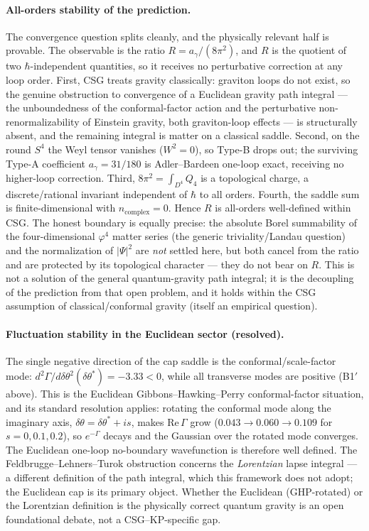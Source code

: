\documentclass[11pt,a4paper]{article}
\theoremstyle{plain}
\theoremstyle{definition}
\theoremstyle{remark}
\newcommand{\ag}{a_\gamma}
\newcommand{\dtheta}{\delta\theta}
\begin{document}
\paragraph{All-orders stability of the prediction.} The convergence question splits cleanly, and
the physically relevant half is provable. The observable is the ratio $R=\ag/(8\pi^2)$, and $R$
is the quotient of two $\hbar$-independent quantities, so it receives no perturbative correction
at any loop order. First, CSG treats gravity classically: graviton loops do not exist, so the
genuine obstruction to convergence of a Euclidean gravity path integral --- the unboundedness of
the conformal-factor action and the perturbative non-renormalizability of Einstein gravity, both
graviton-loop effects --- is structurally absent, and the remaining integral is matter on a
classical saddle. Second, on the round $S^4$ the Weyl tensor vanishes ($W^2=0$), so Type-B drops
out; the surviving Type-A coefficient $\ag=31/180$ is Adler--Bardeen one-loop exact, receiving no
higher-loop correction. Third, $8\pi^2=\int_{D^4}Q_4$ is a topological charge, a
discrete/rational invariant independent of $\hbar$ to all orders. Fourth, the saddle sum is
finite-dimensional with $n_{\mathrm{complex}}=0$. Hence $R$ is all-orders well-defined within CSG.
The honest boundary is equally precise: the absolute Borel summability of the four-dimensional
$\varphi^4$ matter series (the generic triviality/Landau question) and the normalization of
$|\Psi|^2$ are \emph{not} settled here, but both cancel from the ratio and are protected by its
topological character --- they do not bear on $R$. This is not a solution of the general
quantum-gravity path integral; it is the decoupling of the prediction from that open problem, and
it holds within the CSG assumption of classical/conformal gravity (itself an empirical question).

\paragraph{Fluctuation stability in the Euclidean sector (resolved).} The single negative
direction of the cap saddle is the conformal/scale-factor mode: $d^2\Gamma/d\dtheta^2(\dtheta^*) =
-3.33 < 0$, while all transverse modes are positive (B1$'$ above). This is the Euclidean
Gibbons--Hawking--Perry conformal-factor situation, and its standard resolution applies: rotating
the conformal mode along the imaginary axis, $\dtheta = \dtheta^* + is$, makes $\mathrm{Re}\,
\Gamma$ grow ($0.043 \to 0.060 \to 0.109$ for $s = 0, 0.1, 0.2$), so $e^{-\Gamma}$ decays and the
Gaussian over the rotated mode converges. The Euclidean one-loop no-boundary wavefunction is
therefore well defined. The Feldbrugge--Lehners--Turok obstruction concerns the \emph{Lorentzian}
lapse integral --- a different definition of the path integral, which this framework does not
adopt; the Euclidean cap is its primary object. Whether the Euclidean (GHP-rotated) or the
Lorentzian definition is the physically correct quantum gravity is an open foundational debate,
not a CSG--KP-specific gap.
\end{document}
